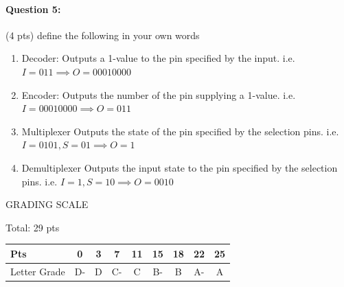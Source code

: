 \documentclass[12pt,letterpaper,titlepage]{report}
\begin{document}
\begin{raggedright}
\paragraph{Question 5:}
(4 pts) define the following in your own words 
\begin{enumerate} [label=\alph*)]
\item Decoder: Outputs a 1-value to the pin specified by the input. i.e. $I=011 \implies O=00010000$ 
\item Encoder: Outputs the number of the pin supplying a 1-value. i.e. $I=00010000 \implies O=011$ 
\item Multiplexer Outputs the state of the pin specified by the selection pins. i.e. $I=0101, S=01 \implies O=1$
\item Demultiplexer Outputs the input state to the pin specified by the selection pins. i.e. $I=1, S=10 \implies O=0010$
\end{enumerate}

\vspace{\fill}
\noindent
GRADING SCALE
\medskip

Total: 29 pts
\bigskip

\def\arraystretch{1.5} 
\begin{tabular}{ | l | c | c | c | c | c | c | c | c | } \hline
Pts          & 0  & 3  & 7  & 11 & 15 & 18 & 22 & 25     \\\hline
Letter Grade & D- & D  & C- & C  & B- & B  & A- & A      \\\hline
\end{tabular}
\end{raggedright}
\end{document}
